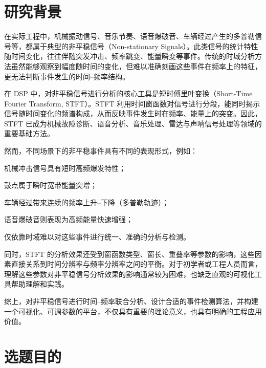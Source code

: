 \documentclass{xjtureport}
\begin{document}
\begin{titlepage}
	
\end{titlepage}







\section{研究背景}

在实际工程中，机械振动信号、音乐节奏、语音爆破音、车辆经过产生的多普勒信号等，都属于典型的非平稳信号（Non-stationary Signals）。此类信号的统计特性随时间变化，往往伴随突发冲击、频率跳变、能量瞬变等事件。传统的时域分析方法虽然能够观察到幅度随时间的变化，但难以准确刻画这些事件在频率上的特征，更无法判断事件发生的时间–频率结构。

在 DSP 中，对非平稳信号进行分析的核心工具是短时傅里叶变换（Short-Time Fourier Transform, STFT）。STFT 利用时间窗函数对信号进行分段，能同时揭示信号随时间变化的频谱构成，从而反映事件发生时在频率、能量上的突变。因此，STFT 已成为机械故障诊断、语音分析、音乐处理、雷达与声呐信号处理等领域的重要基础方法。

然而，不同场景下的非平稳事件具有不同的表现形式，例如：

机械冲击信号具有短时高频爆发特性；

鼓点属于瞬时宽带能量突增；

车辆经过带来连续的频率上升–下降（多普勒轨迹）；

语音爆破音则表现为高频能量快速增强；

仅依靠时域难以对这些事件进行统一、准确的分析与检测。

同时，STFT 的分析效果还受到窗函数类型、窗长、重叠率等参数的影响，这些因素直接关系到时间分辨率与频率分辨率之间的平衡。对于初学者或工程人员而言，理解这些参数对非平稳信号分析效果的影响通常较为困难，也缺乏直观的可视化工具帮助理解和实践。

综上，对非平稳信号进行时间–频率联合分析、设计合适的事件检测算法，并构建一个可视化、可调参数的平台，不仅具有重要的理论意义，也具有明确的工程应用价值。

\section{选题目的}
\end{document}
